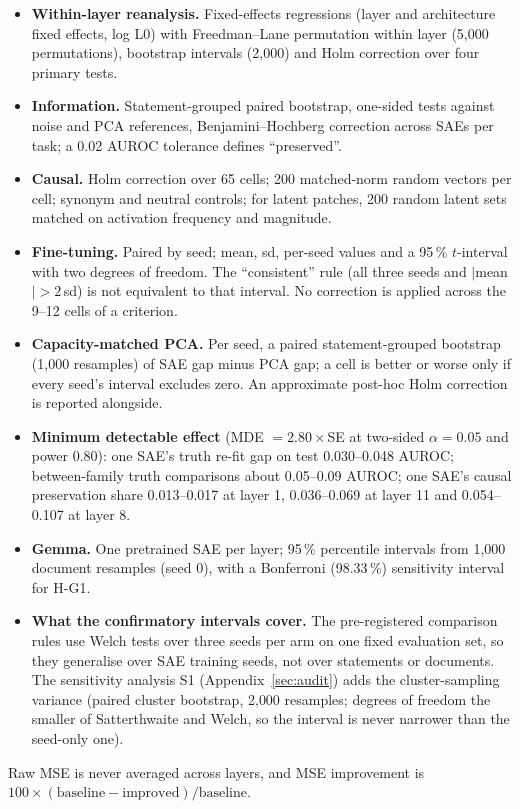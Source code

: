 \begin{itemize}
  \item \textbf{Within-layer reanalysis.} Fixed-effects regressions (layer and architecture fixed effects, log L0) with
        Freedman--Lane permutation within layer (5{,}000 permutations), bootstrap intervals (2{,}000) and Holm
        correction over four primary tests.
  \item \textbf{Information.} Statement-grouped paired bootstrap, one-sided tests against noise and PCA references,
        Benjamini--Hochberg correction across SAEs per task; a 0.02 AUROC tolerance defines ``preserved''.
  \item \textbf{Causal.} Holm correction over 65 cells; 200 matched-norm random vectors per cell; synonym and neutral
        controls; for latent patches, 200 random latent sets matched on activation frequency and magnitude.
  \item \textbf{Fine-tuning.} Paired by seed; mean, sd, per-seed values and a 95\,\% $t$-interval with two degrees of
        freedom. The ``consistent'' rule (all three seeds and $|$mean$|>2$\,sd) is not equivalent to that interval. No
        correction is applied across the 9--12 cells of a criterion.
  \item \textbf{Capacity-matched PCA.} Per seed, a paired statement-grouped bootstrap (1{,}000 resamples) of SAE gap minus
        PCA gap; a cell is better or worse only if every seed's interval excludes zero. An approximate post-hoc Holm
        correction is reported alongside.
  \item \textbf{Minimum detectable effect} (MDE $=2.80\times$SE at two-sided $\alpha=0.05$ and power 0.80): one SAE's
        truth re-fit gap on test 0.030--0.048 AUROC; between-family truth comparisons about 0.05--0.09 AUROC; one SAE's
        causal preservation share 0.013--0.017 at layer 1, 0.036--0.069 at layer 11 and 0.054--0.107 at layer 8.
  \item \textbf{Gemma.} One pretrained SAE per layer; 95\,\% percentile intervals from 1{,}000 document resamples (seed
        0), with a Bonferroni (98.33\,\%) sensitivity interval for H-G1.
  \item \textbf{What the confirmatory intervals cover.} The pre-registered comparison rules use Welch tests over three
        seeds per arm on one fixed evaluation set, so they generalise over SAE training seeds, not over statements or
        documents. The sensitivity analysis S1 (Appendix~\ref{sec:audit}) adds the cluster-sampling variance (paired
        cluster bootstrap, 2{,}000 resamples; degrees of freedom the smaller of Satterthwaite and Welch, so the interval is
        never narrower than the seed-only one).
\end{itemize}
Raw MSE is never averaged across layers, and MSE improvement is $100\times(\text{baseline}-\text{improved})/\text{baseline}$.


